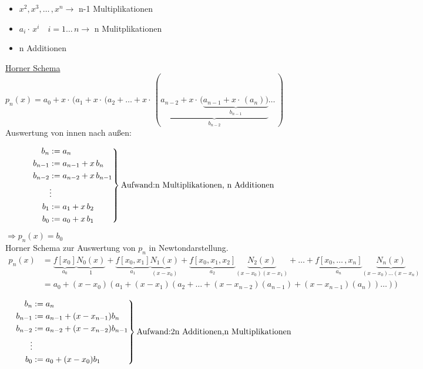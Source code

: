 \begin{itemize}
	\item $x^2, x^3,\ldots\,,x^n \rightarrow$ n-1 Multiplikationen
	\item $a_i\cdot\,x^i \quad i = 1\ldots\,n \rightarrow$ n Mulitplikationen
	\item n Additionen
\end{itemize}

\underline{Horner Schema}
$p_n(x) = a_0 + x\cdot\,(a_1 + x\cdot\,(a_2 + \ldots + x\cdot\,(\underbrace{a_{n-2} + x\cdot\,(\underbrace{a_{n-1} + x\cdot\,(a_n))}_{b_{n-1}}}_{b_{n-2}}\ldots\,)$
Auswertung von innen nach außen:

\begin{equation*}
\left.
\begin{aligned}
 b_n &:= a_n \\
 b_{n-1} &:= a_{n-1} + x\,b_n \\
 b_{n-2} &:= a_{n-2} + x\,b_{n-1} \\
 & \vdots \\
 b_{1} &:= a_{1} + x\,b_{2} \\
 b_{0} &:= a_{0} + x\,b_{1} 
\end{aligned}
\right\}
\text{Aufwand:} \\
\text{n Multiplikationen, n Additionen}
\end{equation*}
$\Rightarrow p_n(x) = b_0$\\

Horner Schema zur Auswertung von $p_n$ in Newtondarstellung.\\
\begin{align*}
 p_n(x) &= \underbrace{f[x_0]}_{a_0}\underbrace{N_0(x)}_{1} + \underbrace{f[x_0,x_1]}_{a_1}\underbrace{N_1(x)}_{(x-x_0)}
+ \underbrace{f[x_0,x_1,x_2]}_{a_2}\underbrace{N_2(x)}_{(x-x_0)(x-x_1)} + \ldots + \underbrace{f[x_0,\ldots\,,x_n]}_{a_n}\underbrace{N_n(x)}_{(x-x_0)\ldots(x-x_n)} \\
 &= a_0 + (x-x_0)(a_1 + (x-x_1)(a_2+ \ldots + (x-x_{n-2})(a_{n-1})+(x-x_{n-1})(a_n))\ldots)) \\
\end{align*}
\begin{equation*}
\left.
\begin{aligned}
 b_n &:= a_n \\
 b_{n-1} &:= a_{n-1} + (x-x_{n-1})b_n \\
 b_{n-2} &:= a_{n-2} + (x-x_{n-2})b_{n-1} \\
 \vdots \\
 b_0 &:= a_0 + (x-x_0)b_1
\end{aligned}
\right\}
\text{Aufwand: \\
2n Additionen, \\
n Multiplikationen}
\end{equation*}

